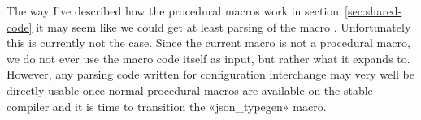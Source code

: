 The way I've described how the procedural macros work in section~\ref{sec:shared-code} it may seem like we could get at least parsing of the macro . Unfortunately this is currently not the case. Since the current macro is not a procedural macro, we do not ever use the macro code itself as input, but rather what it expands to. However, any parsing code written for configuration interchange may very well be directly usable once normal procedural macros are available on the stable compiler and it is time to transition the «json_typegen» macro.



